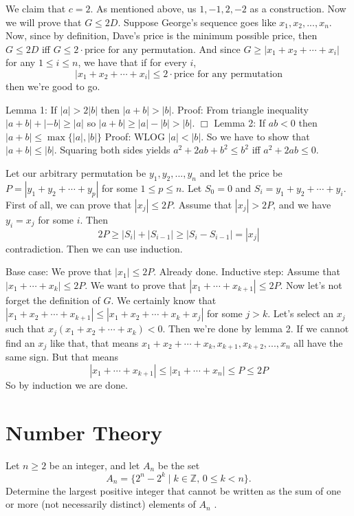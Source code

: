 \documentclass{subfile}
\begin{document}
		
		\begin{solution} We claim that $c = 2$. As mentioned above, us $1, -1, 2, -2$ as a construction. Now we will prove that $G \leq 2D$. Suppose George's sequence goes like $x_1, x_2, ..., x_n$. Now, since by definition, Dave's price is the minimum possible price, then $G \leq 2D$ iff $G \leq 2 \cdot \text{price for any permutation}$. And since $G \geq |x_1 + x_2 + \cdots + x_i|$ for any $1 \leq i \leq n$, we have that if for every $i$,
			$$|x_1 + x_2 + \cdots + x_i| \le 2 \cdot \text{price for any permutation}$$then we're good to go.
			
			Lemma 1: If $|a| > 2|b|$ then $|a+b| > |b|$.
			Proof: From triangle inequality $|a+b| + |-b| \ge |a|$ so $|a+b| \ge |a| - |b| > |b|$. $\Box$
			Lemma 2: If $ab < 0$ then $|a+b| \le \max \{|a|, |b|\}$
			Proof: WLOG $|a| < |b|$. So we have to show that $|a+b| \le |b|$. Squaring both sides yields $a^2 + 2ab + b^2 \le b^2$ iff $a^2 + 2ab \le 0$.
			
			Let our arbitrary permutation be $y_1, y_2, ..., y_n$ and let the price be $P = |y_1 + y_2 + \cdots + y_p|$ for some $1 \le p \le n$. Let $S_0 = 0$ and $S_i = y_1 + y_2 + \cdots + y_i$. First of all, we can prove that $|x_j| \le 2P$. Assume that $|x_j| > 2P$, and we have $y_i = x_j$ for some $i$. Then $$2P \ge |S_i| + |S_{i-1}| \ge |S_i - S_{i-1}| = |x_j|$$contradiction. Then we can use induction.
			
			Base case: We prove that $|x_1| \le 2P$. Already done.
			Inductive step: Assume that $|x_1 + \cdots + x_k| \le 2P$. We want to prove that $|x_1 + \cdots + x_{k+1}| \le 2P$. Now let's not forget the definition of $G$. We certainly know that $|x_1 + x_2 + \cdots + x_{k+1}| \le |x_1 + x_2 + \cdots + x_k + x_j|$ for some $j > k$. Let's select an $x_j$ such that $x_j (x_1 + x_2 + \cdots + x_k) < 0$. Then we're done by lemma 2. If we cannot find an $x_j$ like that, that means $x_1 +x_2 + \cdots + x_k, x_{k+1}, x_{k+2}, ..., x_n$ all have the same sign. But that means
			$$|x_1 + \cdots + x_{k+1}| \le |x_1 + \cdots + x_n| \le P \le 2P$$So by induction we are done.                   
			
		\end{solution}
	
	\newpage
	
	\section{Number Theory}
	\begin{problem}
		Let $n \ge 2$ be an integer, and let $A_n$ be the set \[A_n = \{2^n  - 2^k\mid k \in \mathbb{Z},\, 0 \le k < n\}.\] Determine the largest positive integer that cannot be written as the sum of one or more (not necessarily distinct) elements of $A_n$ .
	\end{problem}
	
\end{document}
